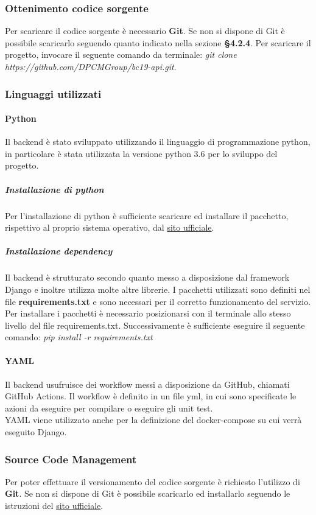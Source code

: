 \subsubsection{Ottenimento codice sorgente}
Per scaricare il codice sorgente è necessario \textbf{Git}. Se non si dispone di Git è possibile scaricarlo seguendo quanto indicato nella sezione \textbf{§4.2.4}. Per scaricare il progetto, invocare il seguente comando da terminale: \textit{git clone https://github.com/DPCMGroup/bc19-api.git}.

\subsubsection{Linguaggi utilizzati}
\paragraph{Python}
Il backend è stato sviluppato utilizzando il linguaggio di programmazione python, in particolare è stata utilizzata la versione python 3.6 per lo sviluppo del progetto.

\subparagraph{Installazione di python}
Per l'installazione di python è sufficiente scaricare ed installare il pacchetto, rispettivo al proprio sistema operativo, dal \href{https://www.python.org/downloads/}{sito ufficiale}.

\subparagraph{Installazione dependency}
Il backend è strutturato secondo quanto messo a disposizione dal framework Django e inoltre utilizza molte altre librerie. I pacchetti utilizzati sono definiti nel file \textbf{requirements.txt} e sono necessari per il corretto funzionamento del servizio.\\
Per installare i pacchetti è necessario posizionarsi con il terminale allo stesso livello del file requirements.txt. Successivamente è sufficiente eseguire il seguente comando: \textit{pip install -r requirements.txt}

\paragraph{YAML}
Il backend usufruisce dei workflow messi a disposizione da GitHub, chiamati GitHub Actions. Il workflow è definito in un file yml, in cui sono specificate le azioni da eseguire per compilare o eseguire gli unit test.
\\YAML viene utilizzato anche per la definizione del docker-compose su cui verrà eseguito Django.

\subsubsection{Source Code Management}
Per poter effettuare il versionamento del codice sorgente è richiesto l'utilizzo di \textbf{Git}. Se non si dispone di Git è possibile scaricarlo ed installarlo seguendo le istruzioni del \href{https://git-scm.com/downloads}{sito ufficiale}.

